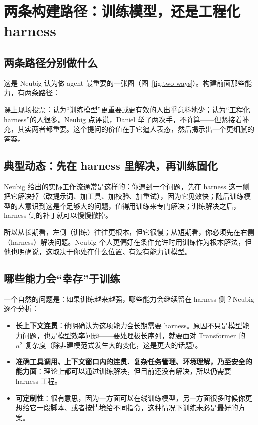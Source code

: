 \documentclass[a4paper]{article}
\begin{document}
\section{两条构建路径：训练模型，还是工程化 harness}

\subsection{两条路径分别做什么}

这是 Neubig 认为做 agent 最重要的一张图（图~\ref{fig:two-ways}）。构建前面那些能力，有两条路径：

课上现场投票：认为“训练模型”更重要或更有效的人出乎意料地少；认为“工程化 harness”的人很多。Neubig 点评说，Daniel 举了两次手，不许算——但紧接着补充，其实两者都重要。这个提问的价值在于它逼人表态，然后揭示出一个更细腻的答案。

\subsection{典型动态：先在 harness 里解决，再训练固化}

Neubig 给出的实际工作流通常是这样的：你遇到一个问题，先在 harness 这一侧把它解决掉（改提示词、加工具、加校验、加重试），因为它见效快；随后训练模型的人意识到这是个足够大的问题，值得用训练来专门解决；训练解决之后，harness 侧的补丁就可以慢慢撤掉。

所以从长期看，左侧（训练）往往更根本，但它很慢；从短期看，你必须先在右侧（harness）解决问题。Neubig 个人更偏好在条件允许时用训练作为根本解法，但他也明确说，这取决于你处在什么位置、有没有能力训模型。

\subsection{哪些能力会“幸存”于训练}

一个自然的问题是：如果训练越来越强，哪些能力会继续留在 harness 侧？Neubig 逐个分析：

\begin{itemize}
\item \textbf{长上下文连贯}：他明确认为这项能力会长期需要 harness。原因不只是模型能力问题，也是模型效率问题——要处理极长序列，就要面对 Transformer 的 $n^2$ 复杂度（除非建模范式发生大的变化，这是更大的话题）。
\item \textbf{准确工具调用、上下文窗口内的连贯、复杂任务管理、环境理解，乃至安全的能力面}：理论上都可以通过训练解决，但目前还没有解决，所以仍需要 harness 工程。
\item \textbf{可定制性}：很有意思，因为一方面可以在线训练模型，另一方面很多时候你更想给它一段脚本、或者按情境给不同指令，这种情况下训练未必是最好的方案。
\end{itemize}
\end{document}
